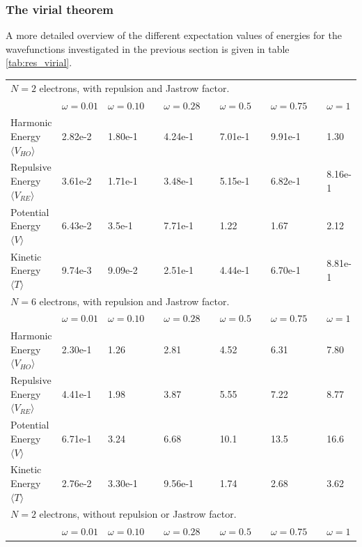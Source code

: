 \subsubsection{The virial theorem }\label{sec:res_virial}

A more detailed overview of the different expectation values of energies for the wavefunctions investigated in the previous section is given in  table \ref{tab:res_virial}.

\begin{table}[h!]
	\centering 
	\begin{tabular}{l@{ } l@{ } l@{ } l@{ } l@{ } l@{ } l}
		\toprule
		\multicolumn{7}{l}{$N=2$ electrons, with repulsion and Jastrow factor.} \\
			& $\omega = 0.01$ &  $\omega = 0.10 \quad $ & $\omega =0.28 \quad $  & $\omega = 0.5 \quad $ & $\omega = 0.75 \quad $ & $\omega = 1$ \\
		\midrule
		Harmonic Energy $\langle V_{HO} \rangle \quad$ &  2.82e-2 & 1.80e-1 & 4.24e-1 & 7.01e-1 & 9.91e-1 & 1.30 \\
		\shaderow Repulsive Energy $\langle V_{RE} \rangle$ & 3.61e-2 & 1.71e-1 & 3.48e-1 & 5.15e-1 & 6.82e-1 & 8.16e-1 \\
		Potential Energy $\langle V \rangle  \quad $ & 6.43e-2 & 3.5e-1 & 7.71e-1 & 1.22 & 1.67 & 2.12 \\
		\shaderow Kinetic Energy $\langle T \rangle$ &  9.74e-3 & 9.09e-2 & 2.51e-1  & 4.44e-1 & 6.70e-1 & 8.81e-1 \\
		\bottomrule
		\toprule
		\multicolumn{7}{l}{$N=6$ electrons, with repulsion and Jastrow factor.} \\
			 & $\omega = 0.01$ &  $\omega = 0.10$ & $\omega =0.28$ & $\omega = 0.5$ & $\omega = 0.75$ & $\omega = 1$ \\
		\midrule
		Harmonic Energy $\langle V_{HO} \rangle$  & 2.30e-1 & 1.26 & 2.81 & 4.52 & 6.31 & 7.80\\
		\shaderow Repulsive Energy $\langle V_{RE} \rangle$ & 4.41e-1 & 1.98 & 3.87 & 5.55 & 7.22 & 8.77\\
		Potential Energy $\langle V \rangle $ & 6.71e-1 &  3.24 & 6.68 & 10.1 & 13.5 & 16.6 \\ 
		\shaderow Kinetic Energy $\langle T \rangle$ & 2.76e-2 &  3.30e-1 & 9.56e-1 & 1.74 & 2.68 & 3.62 \\
		\bottomrule
		\toprule
		\multicolumn{7}{l}{$N=2$ electrons, without repulsion or Jastrow factor.} \\
			& $\omega = 0.01$ &  $\omega = 0.10 \quad $ & $\omega =0.28 \quad $  & $\omega = 0.5 \quad $ & $\omega = 0.75 \quad $ & $\omega = 1$ \\

\end{tabular}
\end{table}
